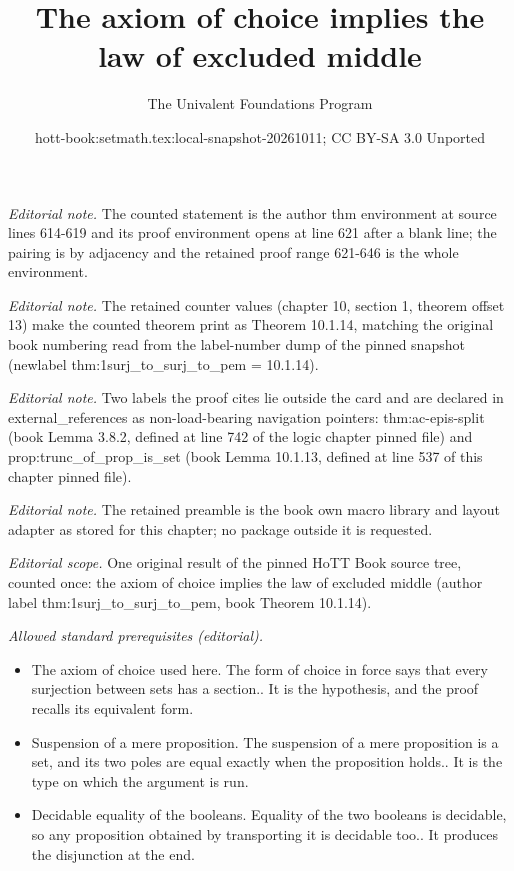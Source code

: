 \documentclass[10pt,a4paper]{article}
\title{The axiom of choice implies the law of excluded middle}
\author{The Univalent Foundations Program}
\date{hott-book:setmath.tex:local-snapshot-20261011; CC BY-SA 3.0 Unported}
\newcounter{chapter}
\theoremstyle{definition}
\theoremstyle{remark}
\numberwithin{equation}{section}
\begin{document}
\maketitle
\setcounter{chapter}{10}
\setcounter{section}{1}
\setcounter{thm}{13}
\noindent\textit{Editorial note.} The counted statement is the author thm environment at source lines 614-619 and its proof environment opens at line 621 after a blank line; the pairing is by adjacency and the retained proof range 621-646 is the whole environment.\par\medskip
\noindent\textit{Editorial note.} The retained counter values (chapter 10, section 1, theorem offset 13) make the counted theorem print as Theorem 10.1.14, matching the original book numbering read from the label-number dump of the pinned snapshot (newlabel thm:1surj\_to\_surj\_to\_pem = 10.1.14).\par\medskip
\noindent\textit{Editorial note.} Two labels the proof cites lie outside the card and are declared in external\_references as non-load-bearing navigation pointers: thm:ac-epis-split (book Lemma 3.8.2, defined at line 742 of the logic chapter pinned file) and prop:trunc\_of\_prop\_is\_set (book Lemma 10.1.13, defined at line 537 of this chapter pinned file).\par\medskip
\noindent\textit{Editorial note.} The retained preamble is the book own macro library and layout adapter as stored for this chapter; no package outside it is requested.\par\medskip
\noindent\textit{Editorial scope.} One original result of the pinned HoTT Book source tree, counted once: the axiom of choice implies the law of excluded middle (author label thm:1surj\_to\_surj\_to\_pem, book Theorem 10.1.14).\par\medskip
\noindent\textit{Allowed standard prerequisites (editorial).}\begin{itemize}
\item The axiom of choice used here. The form of choice in force says that every surjection between sets has a section.. It is the hypothesis, and the proof recalls its equivalent form.
\item Suspension of a mere proposition. The suspension of a mere proposition is a set, and its two poles are equal exactly when the proposition holds.. It is the type on which the argument is run.
\item Decidable equality of the booleans. Equality of the two booleans is decidable, so any proposition obtained by transporting it is decidable too.. It produces the disjunction at the end.
\end{itemize}\medskip
\end{document}
